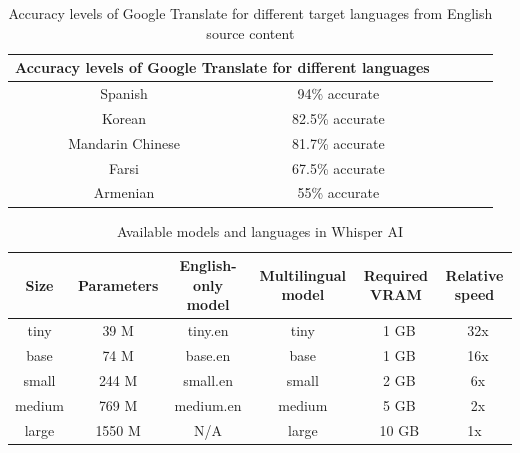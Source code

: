 \documentclass[12px]{beamer}
\begin{document}
\begin{frame}
    \begin{table}[!h]
        \begin{tabular}{|c|c|c|c|c|c|}
            \hline
            \multicolumn{2}{|c|}{\textbf{Accuracy levels of Google Translate for different languages}} \\
            \hline
    
            Spanish & 94\% accurate\\
            \hline
            Korean & 82.5\% accurate\\
            \hline
            Mandarin Chinese & 81.7\% accurate\\
            \hline
            Farsi & 67.5\% accurate\\
            \hline
            Armenian & 55\% accurate\\
            \hline
    
        \end{tabular}
        \caption{Accuracy levels of Google Translate for different target languages from English source content}
    \end{table}
\end{frame}

\begin{frame}
    
\begin{table}[!h]
    \centering
    \begin{tabular}{|c|c|c|c|c|c|}
        \hline
        \textbf{Size} & \textbf{Parameters} & \textbf{English-only model} & \textbf{Multilingual model} & \textbf{Required VRAM} & \textbf{Relative speed}\\
        \hline
        tiny & 39 M & tiny.en & tiny & ~1 GB & ~32x\\
        \hline
        base & 74 M & base.en & base & ~1 GB & ~16x\\
        \hline
        small & 244 M & small.en & small & ~2 GB & ~6x\\
        \hline
        medium & 769 M & medium.en & medium & ~5 GB & ~2x\\
        \hline
        large & 1550 M & N/A & large & ~10 GB & 1x\\
        \hline

    \end{tabular}
    \caption{Available models and languages in Whisper AI}
\end{table}
\end{frame}
\end{document}

